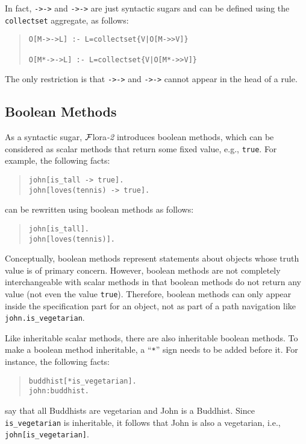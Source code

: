 \documentclass[11pt]{article}
\newcommand{\FLORA}{{\mbox{${\cal F}${\sc lora}\rm\emph{-2}}}\xspace}
\begin{document}
In fact, {\tt ->->} and {\tt *->->} are just syntactic sugars and can be
defined using the {\tt collectset} aggregate, as follows:
\begin{quote}
\begin{verbatim}
O[M->->L] :- L=collectset{V|O[M->>V]}

O[M*->->L] :- L=collectset{V|O[M*->>V]}
\end{verbatim}
\end{quote}

The only restriction is that {\tt ->->} and {\tt *->->} cannot appear in
the head of a rule.


\subsection{Boolean Methods}


%
As a syntactic sugar, \FLORA introduces boolean methods, which can be
considered as scalar methods that return some fixed value, e.g.,
{\tt true}. For example, the following facts:
\begin{quote}
\verb|john[is_tall -> true].| \\
\verb|john[loves(tennis) -> true].|
\end{quote}
can be rewritten using boolean methods as follows:
\begin{quote}
\verb|john[is_tall].| \\
\verb|john[loves(tennis)].|
\end{quote}

Conceptually, boolean methods represent statements about objects whose
truth value is of primary concern. However, boolean methods are not
completely interchangeable with scalar methods in that boolean methods
do not return any value (not even the value {\tt true}). Therefore,
boolean methods can only appear inside the specification part for an
object, not as part of a path navigation like
\mbox{\tt john.is\_vegetarian}.

Like inheritable scalar methods, there are also inheritable boolean
methods. To make a boolean method inheritable, a ``\verb|*|'' sign
needs to be added before it. For instance, the following facts:
\begin{quote}
\begin{verbatim}
buddhist[*is_vegetarian].
john:buddhist.
\end{verbatim}
\end{quote}
say that all Buddhists are vegetarian and {\sf John} is a
Buddhist. Since \verb|is_vegetarian| is inheritable, it follows that
{\sf John} is also a vegetarian, i.e., \verb|john[is_vegetarian]|.
\end{document}
